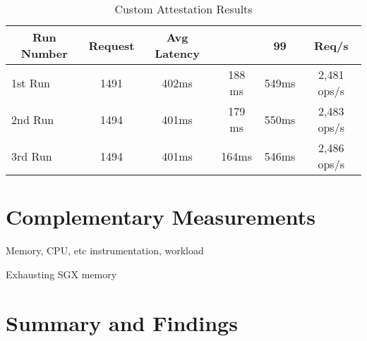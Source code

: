 \begin{table}[ht]
	\caption{Custom Attestation Results}
	\label{tab:custom_attestation_results}
\centering
\begin{tabular}{lccccc}
	\toprule
	\multicolumn{1}{c}{\textbf{Run Number}} & \pmb{\#}\textbf{Request} & \textbf{Avg Latency} & \pmb{\ensuremath{\sigma}} & \textbf{99}\pmb{\%} & \textbf{Req/s} \\
	\midrule
		1st Run & 1491 & 402ms & 188	ms & 549ms & 2,481 ops/s \\
		2nd Run & 1494 & 401ms & 179	ms & 550ms & 2,483 ops/s \\
		3rd Run & 1494 & 401ms & 164ms & 546ms & 2,486 ops/s \\
	\bottomrule
\end{tabular}
\end{table}

\section{Complementary Measurements}
\label{sec:complementary_measurements}

Memory, CPU, etc instrumentation, workload

Exhausting SGX memory

\section{ Summary and Findings}
\label{sec:summary_and_findings}





